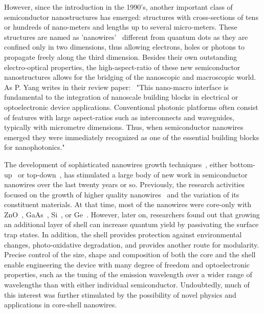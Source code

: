 However, since the introduction in the 1990's, another important class of
semiconductor nanostructures has emerged: structures with cross-sections of
tens or hundreds of nano-meters and lengths up to several micro-meters. These
structures are named as 'nanowires'~\cite{xia2003one} different from quantum
dots as they are confined only in two dimensions, thus allowing electrons,
holes or photons to propagate freely along the third dimension. Besides their
own outstanding electro-optical properties, the high-aspect-ratio of these new
semiconductor nanostructures allows for the bridging of the nanoscopic and
macroscopic world. As P. Yang writes in their review paper:~\cite{Yan:2009hm}
"This nano-macro interface is fundamental to the integration of nanoscale
building blocks in electrical or optoelectronic device applications.
Conventional photonic platforms often consist of features with large
aspect-ratios such as interconnects and waveguides, typically with micrometre
dimensions. Thus, when semiconductor nanowires emerged they were immediately
recognized as one of the essential building blocks for nanophotonics."

The development of sophisticated nanowires growth
techniques~\cite{hobbs2012semiconductor,wu2001direct}, either
bottom-up~\cite{lu2007nanoelectronics,Huang:2001kv} or
top-down~\cite{park2009top}, has stimulated a large body of new work in
semiconductor nanowires over the last twenty years or so. Previously, the
research activities focused on the growth of higher quality
nanowires~\cite{Yang:2002ts} and the variation of its constituent materials. At
that time, most of the nanowires were core-only with ZnO~\cite{Yang:2002ts},
GaAs~\cite{persson2004solid}, Si~\cite{hochbaum2005controlled}, or
Ge~\cite{wu2000germanium}. However, later on, researchers found out that
growing an additional layer of shell can increase quantum yield by passivating
the surface trap states. In addition, the shell provides protection against
environmental changes, photo-oxidative degradation, and provides another route
for modularity. Precise control of the size, shape and composition of both the
core and the shell enable engineering the device with many degree of freedom
and optoelectronic properties, such as the tuning of the emission wavelength
over a wider range of wavelengths than with either individual semiconductor.
Undoubtedly, much of this interest was further stimulated by the possibility of
novel physics and applications in core-shell nanowires.

